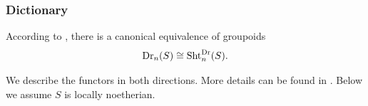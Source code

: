 \documentclass[11pt]{amsart}
\numberwithin{equation}{section}
\theoremstyle{plain}
\theoremstyle{definition}
\def\GG{\mathbb{G}}
\newcommand\cO{\mathcal{O}}
\newcommand\cP{\mathcal{P}}
\newcommand{\coker}{\textup{coker}}
\newcommand\Sht{\textup{Sht}}
\newcommand\Spec{\textup{Spec}\ }
\newcommand\End{\textup{End}}
\newcommand\GL{\textup{GL}}
\renewcommand{\j}[1]{\langle{#1}\rangle}
\newcommand\un{\underline}
\newcommand\sss{\subsubsection}
\renewcommand\a\alpha
\renewcommand{\t}{\tau}
\renewcommand{\l}{\lambda}
\newcommand{\Dr}{\mathrm{Dr}}
\begin{document}
\sss{Dictionary}\label{sss:dict} According to \cite{Mum}, there is a canonical equivalence of groupoids
\begin{equation*}
\Dr_{n}(S)\cong \Sht^{\Dr}_{n}(S). 
\end{equation*}




We describe the functors in both directions. More details can be found in \cite[Chapter 6]{Goss}. Below we assume $S$ is locally noetherian.
\end{document}
